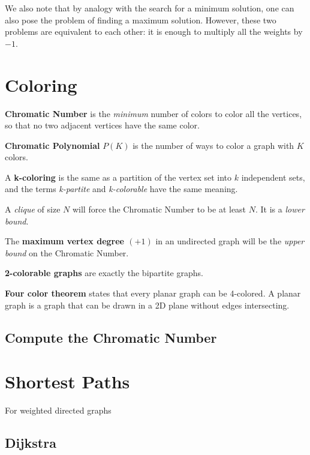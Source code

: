 		We also note that by analogy with the search for a minimum solution, one can also pose the problem of finding a maximum solution. 
		However, these two problems are equivalent to each other: it is enough to multiply all the weights by $-1$.

	
\newpage

\section{Coloring}

	\textbf{Chromatic Number} is the \textit{minimum} number of colors to color all the vertices, so that no two adjacent vertices have the same color.

	\textbf{Chromatic Polynomial} $P(K)$ is the number of ways to color a graph with $K$ colors. 

	A \textbf{k-coloring} is the same as a partition of the vertex set into $k$ independent sets, and the terms \textit{k-partite} and \textit{k-colorable} have the same meaning.
	
	A \textit{clique} of size $N$ will force the Chromatic Number to be at least $N$. It is a \textit{lower bound}.

	The \textbf{maximum vertex degree $(+1)$} in an undirected graph will be the \textit{upper bound} on the Chromatic Number.

	\textbf{2-colorable graphs} are exactly the bipartite graphs.

	\textbf{Four color theorem} states that every planar graph can be 4-colored. 
	A planar graph is a graph that can be drawn in a 2D plane without edges intersecting.


	\subsection{Compute the Chromatic Number}



\section{Shortest Paths}

	For weighted directed graphs

	\subsection{Dijkstra}

